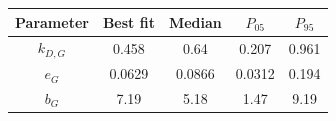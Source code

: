 \begin{tabular}{ccccc}
\toprule
Parameter & Best fit & Median & $P_{05}$ & $P_{95}$\\
\midrule
$k_{D,G}$ & 0.458 & 0.64 & 0.207 & 0.961\\
$e_G$ & 0.0629 & 0.0866 & 0.0312 & 0.194\\
$b_G$ & 7.19 & 5.18 & 1.47 & 9.19\\
\bottomrule
\end{tabular}
